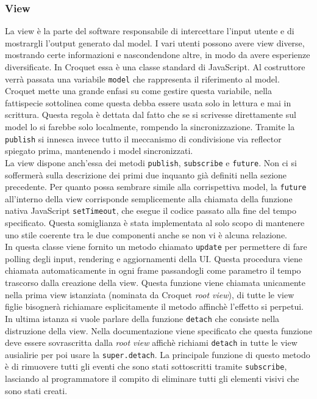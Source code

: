 \subsubsection{View}\label{subsubsec:Croquet_view}
La view è la parte del software responsabile di intercettare l'input utente e di mostrargli l'output generato dal model. I vari utenti possono avere view 
diverse, mostrando certe informazioni e nascondendone altre, in modo da avere esperienze diversificate. In Croquet essa è una classe standard di JavaScript.
Al costruttore verrà passata una variabile \texttt{model} che rappresenta il riferimento al model. Croquet mette una grande enfasi su come gestire questa variabile, nella fattispecie
sottolinea come questa debba essere usata solo in lettura e mai in scrittura. Questa regola è dettata dal fatto che se si scrivesse direttamente sul model lo si farebbe solo 
localmente, rompendo la sincronizzazione. Tramite la \texttt{publish} si innesca invece tutto il meccanismo di condivisione via reflector spiegato prima, mantenendo i model
sincronizzati.\\
\newline
La view dispone anch'essa dei metodi \texttt{publish}, \texttt{subscribe} e \texttt{future}. Non ci si soffermerà sulla descrizione dei primi due inquanto già definiti
nella sezione precedente. Per quanto possa sembrare simile alla corrispettiva model, la \texttt{future} all'interno della view corrisponde semplicemente alla chiamata della 
funzione nativa JavaScript \texttt{setTimeout}, che esegue il codice passato alla fine del tempo specificato. Questa somiglianza è stata implementata al solo scopo di mantenere uno stile
coerente tra le due componenti anche se non vi è alcuna relazione.\\
\newline
In questa classe viene fornito un metodo chiamato \texttt{update} per permettere di fare polling degli input, rendering e aggiornamenti della UI. Questa procedura viene chiamata
automaticamente in ogni frame passandogli come parametro il tempo trascorso dalla creazione della view. Questa funzione viene chiamata unicamente nella prima
view istanziata (nominata da Croquet \textit{root view}), di tutte le view figlie bisognerà richiamare esplicitamente il metodo affinchè l'effetto si perpetui.\\
\newline
In ultima istanza si vuole parlare della funzione \texttt{detach} che consiste nella distruzione della view. Nella documentazione viene specificato che questa funzione deve essere
sovrascritta dalla \textit{root view} affichè richiami \texttt{detach} in tutte le view ausialirie per poi usare la \texttt{super.detach}. La principale funzione di questo metodo
è di rimuovere tutti gli eventi che sono stati sottoscritti tramite \texttt{subscribe}, lasciando al programmatore il compito di eliminare tutti gli elementi visivi che sono stati
creati.\\

